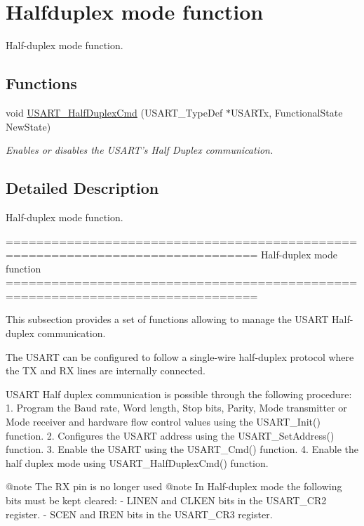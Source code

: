\hypertarget{group___u_s_a_r_t___group5}{\section{Halfduplex mode function}
\label{group___u_s_a_r_t___group5}
}


Half-\/duplex mode function.  


\subsection*{Functions}
\begin{DoxyCompactItemize}
\item 
void \hyperlink{group___u_s_a_r_t___group5_gaaa23b05fe0e1896bad90da7f82750831}{U\-S\-A\-R\-T\-\_\-\-Half\-Duplex\-Cmd} (U\-S\-A\-R\-T\-\_\-\-Type\-Def $\ast$U\-S\-A\-R\-Tx, Functional\-State New\-State)
\begin{DoxyCompactList}\small\item\em Enables or disables the U\-S\-A\-R\-T's Half Duplex communication. \end{DoxyCompactList}\end{DoxyCompactItemize}


\subsection{Detailed Description}
Half-\/duplex mode function. \begin{DoxyVerb} ===============================================================================
                         Half-duplex mode function
 ===============================================================================  

  This subsection provides a set of functions allowing to manage the USART 
  Half-duplex communication.
  
  The USART can be configured to follow a single-wire half-duplex protocol where 
  the TX and RX lines are internally connected.

  USART Half duplex communication is possible through the following procedure:
     1. Program the Baud rate, Word length, Stop bits, Parity, Mode transmitter 
        or Mode receiver and hardware flow control values using the USART_Init()
        function.
     2. Configures the USART address using the USART_SetAddress() function.
     3. Enable the USART using the USART_Cmd() function.
     4. Enable the half duplex mode using USART_HalfDuplexCmd() function.


@note The RX pin is no longer used
@note In Half-duplex mode the following bits must be kept cleared:
        - LINEN and CLKEN bits in the USART_CR2 register.
        - SCEN and IREN bits in the USART_CR3 register.\end{DoxyVerb}
 

